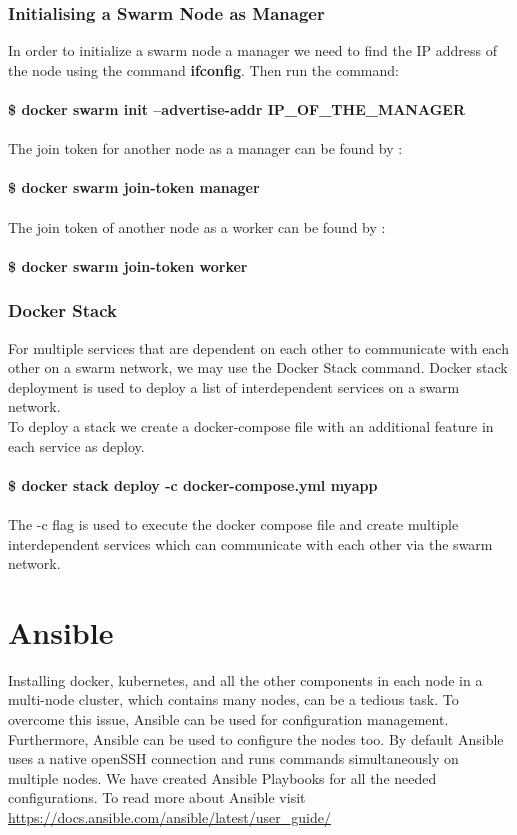 \documentclass[12pt]{report}
\begin{document}
\subsection{Initialising a Swarm Node as Manager}
In order to initialize a swarm node a manager we need to find the IP address of the node using the command \textbf{ifconfig}. Then run the command:\\\\
\textbf{\$ docker swarm init --advertise-addr IP\_OF\_THE\_MANAGER}\\\\
The join token for another node as a manager can be found by :\\\\
\textbf{\$ docker swarm join-token manager\\\\}
The join token of another node as a worker can be found by :\\\\
\textbf{\$ docker swarm join-token worker}
\subsection{Docker Stack}
For multiple services that are dependent on each other to communicate with each other on a swarm network, we may use the Docker Stack command. Docker stack deployment is used to deploy a list of interdependent services on a swarm network.\\
To deploy a stack we create a docker-compose file with an additional feature in each service as deploy.\\\\
\textbf{\$ docker stack deploy -c docker-compose.yml myapp}\\\\
The -c flag is used to execute the docker compose file and create multiple interdependent services which can communicate with each other via the swarm network.
\chapter{Ansible}
Installing docker, kubernetes, and all the other components in each node in a multi-node cluster, which contains many nodes, can be a tedious task. To overcome this issue, Ansible can be used for configuration management. Furthermore, Ansible can be used to configure the nodes too. By default Ansible uses a native openSSH connection and runs commands simultaneously on multiple nodes. We have created Ansible Playbooks for all the needed configurations. To read more about Ansible visit \href{https://docs.ansible.com/ansible/latest/user_guide/}{https://docs.ansible.com/ansible/latest/user\_guide/}\cite{Ansidoc}
\end{document}
